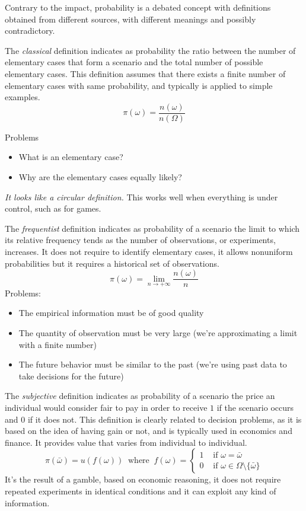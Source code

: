 Contrary to the impact, probability is a debated concept with definitions obtained from different sources, with different meanings and possibly contradictory.

The \textit{classical} definition indicates as probability the ratio between the number of elementary cases that form a scenario and the total number of possible elementary cases. This definition assumes that there exists a finite number of elementary cases with same probability, and typically is applied to simple examples.
$$ \pi (\omega) = \frac{n (\omega)}{n (\Omega)} $$

Problems
\begin{itemize}
	\item What is an elementary case? 
	
	\item Why are the elementary cases equally likely?
\end{itemize}
\textit{It looks like a circular definition.} This works well when everything is under control, such as for games.

The \textit{frequentist} definition indicates as probability of a scenario the limit to which its relative frequency tends as the number of observations, or experiments, increases. It does not require to identify elementary cases, it allows nonuniform probabilities but it requires a historical set of observations.
$$ \pi (\omega) = \lim_{n \rightarrow + \infty} \frac{n(\omega)}{n} $$
Problems:
\begin{itemize}
	\item The empirical information must be of good quality
	
	\item The quantity of observation must be very large (we're approximating a limit with a finite number)
	
	\item The future behavior must be similar to the past (we're using past data to take decisions for the future)
\end{itemize}

The \textit{subjective} definition indicates as probability of a scenario the price an individual would consider fair to pay in order to receive $1$ if the scenario occurs and $0$ if it does not. This definition is clearly related to decision problems, as it is based on the idea of having gain or not, and is typically used in economics and finance. It provides value that varies from individual to individual.
$$ \pi(\bar \omega) = u(f(\omega))  \ \text{ where } \ f(\omega) = \begin{cases}
	1 & \text{ if } \omega = \bar \omega \\
	0 & \text{ if } \omega \in \Omega \setminus \{\bar \omega\}
\end{cases}$$
It's the result of a gamble, based on economic reasoning, it does not require repeated experiments in identical conditions and it can exploit any kind of information. 

